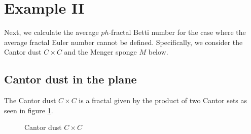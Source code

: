 \documentclass[12pt]{amsart}
\numberwithin{equation}{section}
\def\II{{\rm I\hspace{-.1em}I}}
\begin{document}
\section{Example \II}
Next, we calculate the average $ph$-fractal Betti number for the case where the average fractal Euler number cannot be defined. 
Specifically, we consider the Cantor dust $C\times C$ and the Menger sponge $M$ below.

\subsection{Cantor dust in the plane}
    The Cantor dust $C \times C$ is a fractal given by the product of two Cantor sets as seen in figure \ref{fig: const. of Cantor dust}.
    \begin{figure}[hbt]
    \centering
    \begin{minipage}{0.2\textwidth}
    \end{minipage}
    \begin{minipage}{0.2\textwidth}
    \end{minipage}
    \begin{minipage}{0.2\textwidth}
    \end{minipage}
    \begin{minipage}{0.2\textwidth}
    \end{minipage}
    \caption{Cantor dust $C \times C$}
    \label{fig: const. of Cantor dust}
    \end{figure}
\end{document}
